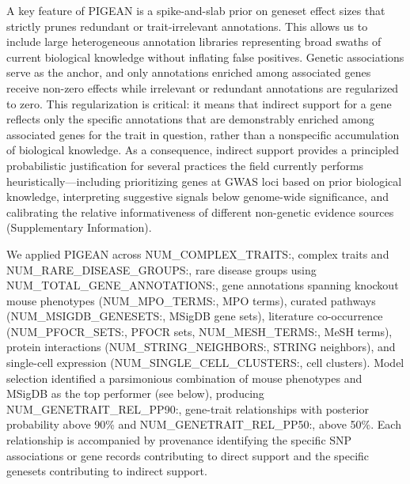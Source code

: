 A key feature of PIGEAN is a spike-and-slab prior on geneset effect sizes that strictly prunes redundant or trait-irrelevant annotations. This allows us to include large heterogeneous annotation libraries representing broad swaths of current biological knowledge without inflating false positives. Genetic associations serve as the anchor, and only annotations enriched among associated genes receive non-zero effects while irrelevant or redundant annotations are regularized to zero. This regularization is critical: it means that indirect support for a gene reflects only the specific annotations that are demonstrably enriched among associated genes for the trait in question, rather than a nonspecific accumulation of biological knowledge. As a consequence, indirect support provides a principled probabilistic justification for several practices the field currently performs heuristically---including prioritizing genes at GWAS loci based on prior biological knowledge, interpreting suggestive signals below genome-wide significance, and calibrating the relative informativeness of different non-genetic evidence sources (Supplementary Information).

We applied PIGEAN across {{NUM_COMPLEX_TRAITS:,}} complex traits and {{NUM_RARE_DISEASE_GROUPS:,}} rare disease groups using {{NUM_TOTAL_GENE_ANNOTATIONS:,}} gene annotations spanning knockout mouse phenotypes ({{NUM_MPO_TERMS:,}} MPO terms), curated pathways ({{NUM_MSIGDB_GENESETS:,}} MSigDB gene sets), literature co-occurrence ({{NUM_PFOCR_SETS:,}} PFOCR sets, {{NUM_MESH_TERMS:,}} MeSH terms), protein interactions ({{NUM_STRING_NEIGHBORS:,}} STRING neighbors), and single-cell expression ({{NUM_SINGLE_CELL_CLUSTERS:,}} cell clusters). Model selection identified a parsimonious combination of mouse phenotypes and MSigDB as the top performer (see below), producing {{NUM_GENETRAIT_REL_PP90:,}} gene-trait relationships with posterior probability above 90\% and {{NUM_GENETRAIT_REL_PP50:,}} above 50\%. Each relationship is accompanied by provenance identifying the specific SNP associations or gene records contributing to direct support and the specific genesets contributing to indirect support.
